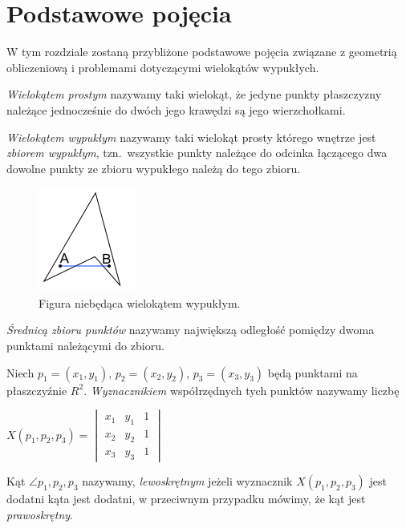 \chapter{Podstawowe pojęcia}
\label{chap:pojecia}

W tym rozdziale zostaną przybliżone podstawowe pojęcia związane z
geometrią obliczeniową i problemami dotyczącymi wielokątów wypukłych.

\begin{definicja}
  \emph{Wielokątem prostym} nazywamy taki wielokąt, że jedyne punkty
  płaszczyzny należące jednocześnie do dwóch jego krawędzi są jego
  wierzchołkami.
\end{definicja}

\begin{definicja}
  \emph{Wielokątem wypukłym} nazywamy taki wielokąt prosty którego
  wnętrze jest \emph{zbiorem wypukłym}, tzn.\ wszystkie punkty
  należące do odcinka łączącego dwa dowolne punkty ze zbioru wypukłego
  należą do tego zbioru.
\end{definicja}

\begin{figure}[htp]
  \centering
  \includegraphics{img/nonconvex}
  \caption{Figura niebędąca wielokątem wypukłym.}
\end{figure}

\begin{definicja}
  \emph{Średnicą zbioru punktów} nazywamy największą odległość
  pomiędzy dwoma punktami należącymi do zbioru.
\end{definicja}

\begin{definicja}
  Niech $p_{1}=(x_{1},y_{1})$, $p_{2}=(x_{2},y_{2})$,
  $p_{3}=(x_{3},y_{3})$ będą punktami na płaszczyźnie
  $R^2$. \emph{Wyznacznikiem} współrzędnych tych punktów nazywamy
  liczbę

  \begin{center}
    \begin{math}
      X(p_1, p_2, p_3) =
      \begin{vmatrix}
        x_1 & y_1 & 1 \\
        x_2 & y_2 & 1 \\
        x_3 & y_3 & 1
      \end{vmatrix}
    \end{math}
  \end{center}

  Kąt $\angle p_{1},p_{2},p_{3}$ nazywamy, \emph{lewoskrętnym} jeżeli
  wyznacznik $X(p_1, p_2, p_3)$ jest dodatni kąta jest dodatni, w
  przeciwnym przypadku mówimy, że kąt jest \emph{prawoskrętny}.
\end{definicja}

